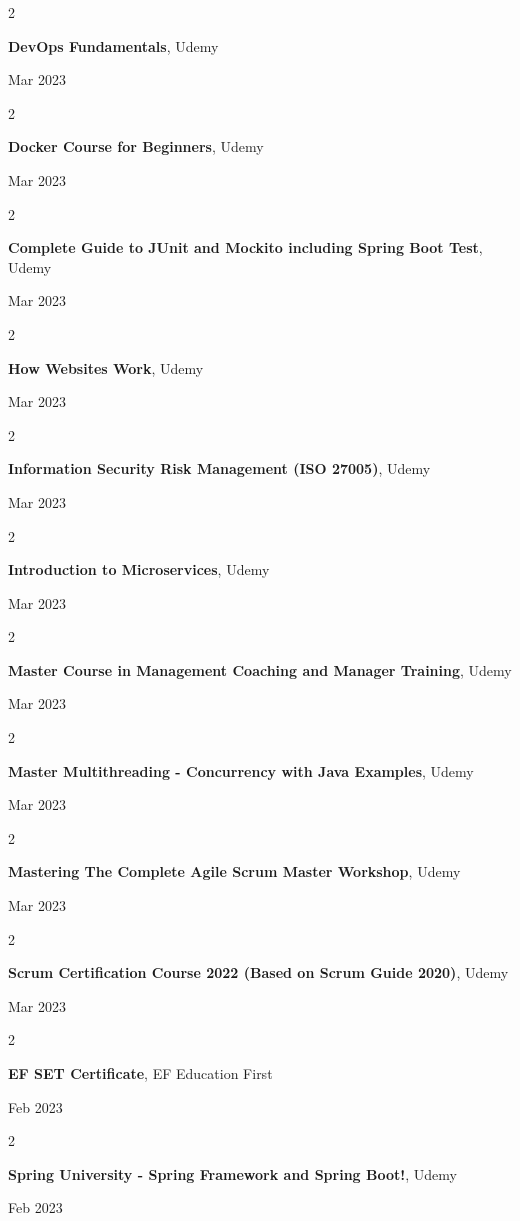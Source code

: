 \documentclass[10pt, letterpaper]{article}
\newenvironment{twocolentry}[2][]{
    \onecolentry
    \def\secondColumn{#2}
    \setcolumnwidth{\fill, 4.5 cm}
    \begin{paracol}{2}
}{
    \switchcolumn \raggedleft \secondColumn
    \end{paracol}
    \endonecolentry
} %
\begin{document}
    \begin{twocolentry}{
            Mar 2023
        }
        \textbf{DevOps Fundamentals}, Udemy
    \end{twocolentry}
    \begin{twocolentry}{
            Mar 2023
        }
        \textbf{Docker Course for Beginners}, Udemy
    \end{twocolentry}
    \begin{twocolentry}{
            Mar 2023
        }
        \textbf{Complete Guide to JUnit and Mockito including Spring Boot Test}, Udemy
    \end{twocolentry}
    \begin{twocolentry}{
            Mar 2023
        }
        \textbf{How Websites Work}, Udemy
    \end{twocolentry}
    \begin{twocolentry}{
            Mar 2023
        }
        \textbf{Information Security Risk Management (ISO 27005)}, Udemy
    \end{twocolentry}
    \begin{twocolentry}{
            Mar 2023
        }
        \textbf{Introduction to Microservices}, Udemy
    \end{twocolentry}
    \begin{twocolentry}{
            Mar 2023
        }
        \textbf{Master Course in Management Coaching and Manager Training}, Udemy
    \end{twocolentry}
    \begin{twocolentry}{
            Mar 2023
        }
        \textbf{Master Multithreading - Concurrency with Java Examples}, Udemy
    \end{twocolentry}
    \begin{twocolentry}{
            Mar 2023
        }
        \textbf{Mastering The Complete Agile Scrum Master Workshop}, Udemy
    \end{twocolentry}
    \begin{twocolentry}{
            Mar 2023
        }
        \textbf{Scrum Certification Course 2022 (Based on Scrum Guide 2020)}, Udemy
    \end{twocolentry}
    \begin{twocolentry}{
            Feb 2023
        }
        \textbf{EF SET Certificate}, EF Education First
    \end{twocolentry}
    \begin{twocolentry}{
            Feb 2023
        }
        \textbf{Spring University - Spring Framework and Spring Boot!}, Udemy
    \end{twocolentry}
\end{document}
